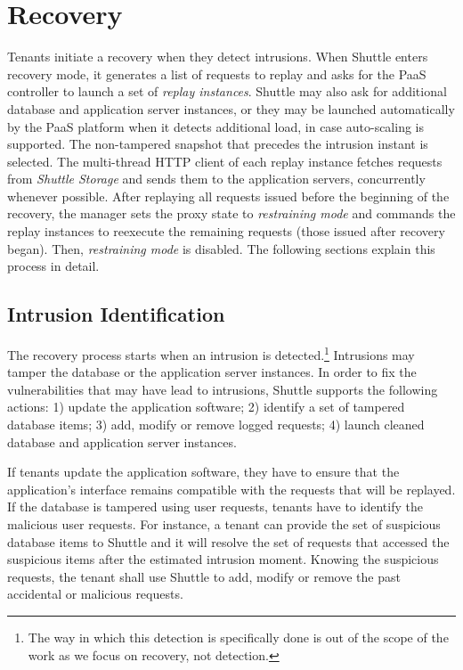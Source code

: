 \section{Recovery}
\label{sec:recovery}

Tenants initiate a recovery when they detect intrusions. When Shuttle enters recovery mode, it generates a list of requests to replay and asks for the \ac{PaaS} controller to launch a set of \textit{replay instances}. Shuttle may also ask for additional database and application server instances, or they may be launched automatically by the \ac{PaaS} platform when it detects additional load, in case auto-scaling is supported. The non-tampered snapshot that precedes the intrusion instant is selected. The multi-thread HTTP client of each replay instance fetches requests from \emph{Shuttle Storage} and sends them to the application servers, concurrently whenever possible. After replaying all requests issued before the beginning of the recovery, the manager sets the proxy state to \emph{restraining mode} and commands the replay instances to reexecute the remaining requests (those issued after recovery began). Then, \emph{restraining mode} is disabled. 
The following sections explain this process in detail.


\subsection{Intrusion Identification}
\label{sec:recovery:detection}

The recovery process starts when an intrusion is detected.\footnote{The way in which this detection is specifically done is out of the scope of the work  as we focus on recovery, not detection.} Intrusions may tamper the database or the application server instances. In order to fix the vulnerabilities that may have lead to intrusions, Shuttle supports the following actions: 1) update the application software; 2) identify a set of tampered database items; 3) add, modify or remove logged requests; 4) launch cleaned database and application server instances.

If tenants update the application software, they have to ensure that the application's interface remains compatible with the requests that will be replayed. If the database is tampered using user requests,  tenants have to identify the malicious user requests. For instance, a tenant can provide the set of suspicious database items to Shuttle and it will resolve the set of requests that accessed the suspicious items after the estimated intrusion moment. Knowing the suspicious requests, the tenant shall use Shuttle to add, modify or remove the past accidental or malicious requests. 

